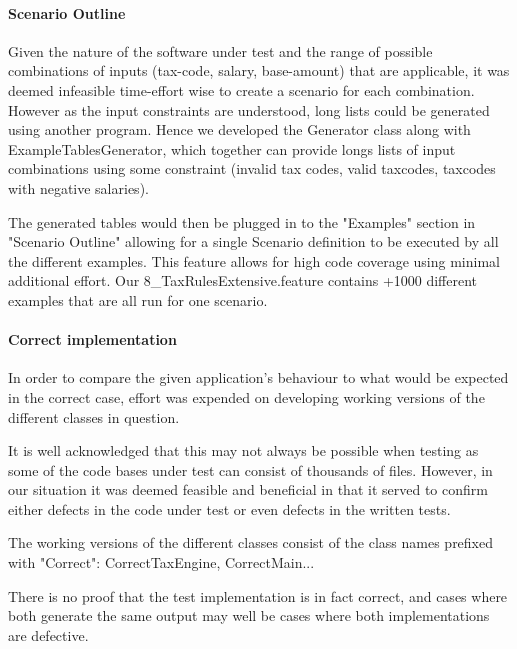 \paragraph{Scenario Outline}
Given the nature of the software under test and the range of possible combinations of inputs (tax-code, salary, base-amount) that are applicable, it was deemed infeasible time-effort wise to create a scenario for each combination. 
However as the input constraints are understood, long lists could be generated using another program. Hence we developed the Generator class along with ExampleTablesGenerator, which together can provide longs lists of input combinations using some constraint (invalid tax codes, valid taxcodes, taxcodes with negative salaries). 
\par 
The generated tables would then be plugged in to the "Examples" section in "Scenario Outline" allowing for a single Scenario definition to be executed by all the different examples. This feature allows for high code coverage using minimal additional effort. Our 8\_TaxRulesExtensive.feature contains +1000 different examples that are all run for one scenario. 

\paragraph{Correct implementation}
In order to compare the given application's behaviour to what would be expected in the correct case, effort was expended on developing working versions of the different classes in question. 
\par 
It is well acknowledged that this may not always be possible when testing as some of the code bases under test can consist of thousands of files. However, in our situation it was deemed feasible and beneficial in that it served to confirm either defects in the code under test or even defects in the written tests. 
\par 
The working versions of the different classes consist of the class names prefixed with "Correct": CorrectTaxEngine, CorrectMain... 
\par 
There is no proof that the test implementation is in fact correct, and cases where both generate the same output may well be cases where both implementations are defective.
